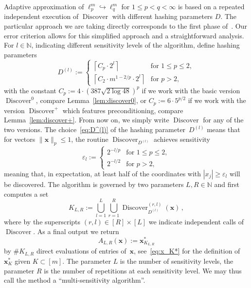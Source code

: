 \documentclass[12pt]{article}
\theoremstyle{plain}
\theoremstyle{definition}
\newcommand{\eps}{\varepsilon}
\newcommand{\embed}{\hookrightarrow}
\renewcommand{\vec}{\boldsymbol}
\newcommand{\N}{{\mathbb N}}
\DeclareMathOperator{\discover}{Discover} %
\begin{document}
Adaptive approximation of $\ell_p^m \embed\ell_q^m$ for
$1 \leq p < q < \infty$
is based on a repeated independent execution of $\discover$ with different hashing parameters $D$.
The particular approach we are taking directly corresponds to the first phase of~\cite[Alg~3]{LNW17}.
Our error criterion allows for this simplified approach and a straightforward analysis.
For $l \in \N$, indicating different sensitivity levels of the algorithm, define hashing parameters
\begin{equation} \label{eq:D^(l)}
    D^{(l)} := 
        \begin{cases}
            \left\lceil C_p \cdot 2^{l} \right\rceil
                &\text{for } 1 \leq p \leq 2, \\
            \left\lceil C_2 \cdot m^{1 - 2/p} \cdot 2^l \right\rceil
                &\text{for } p > 2,
        \end{cases}
\end{equation}
with the constant $C_p := 4 \cdot \left(387\sqrt{2\log48}\right)^p$
if we work with the basic version $\discover^0$, compare Lemma~\ref{lem:discover0},
or $C_p := 6 \cdot 5^{p/2}$ if we work with the version $\discover^+$ which features preconditioning, compare Lemma~\ref{lem:discover+}.
From now on, we simply write $\discover$ for any of the two versions.
The choice~\eqref{eq:D^(l)} of the hashing parameter~$D^{(l)}$
means that for vectors $\|\vec{x}\|_p \leq 1$, the routine $\discover_{D^{(l)}}$
achieves sensitivity
\begin{equation*}
    \eps_l := \begin{cases}
                    2^{-l/p} &\text{for } 1 \leq p \leq 2,\\
                    2^{-l/2} &\text{for } p > 2,
                \end{cases}
\end{equation*}
meaning that, in expectation, at least half of the coordinates with $|x_j| \geq \eps_l$ will be discovered.
The algorithm is governed by two parameters $L, R \in \N$ and first computes a set
\begin{equation*}
    K_{L,R} := \bigcup_{l=1}^L \bigcup_{r=1}^R \discover_{D^{(l)}}^{(r,l)}(\vec{x})\,,
\end{equation*}
where by the superscripts $(r,l) \in [R] \times [L]$ we indicate independent calls of $\discover$.
As a final output we return
\begin{equation*}
    A_{L,R}(\vec{x}) := \vec{x}_{K_{L,R}}^\ast
\end{equation*}
by $\# K_{L,R}$ direct evaluations of entries of~$\vec{x}$,
see~\eqref{eq:x_K*} for the definition of $\vec{x}^{\ast}_K$ given $K \subset [m]$.
The parameter $L$ is the number of sensitivity levels,
the parameter $R$ is the number of repetitions at each sensitivity level.
We may thus call the method a ``multi-sensitivity algorithm''.
\end{document}
